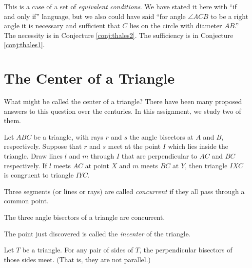 This is a case of a set of \emph{equivalent conditions}. We have stated it
here with ``if and only if'' language, but we also could have said ``for angle $\angle ACB$ to be a right angle it is necessary and sufficient that $C$ lies on the circle with diameter $AB$.'' The necessity is in Conjecture \ref{conj:thales2}. The sufficiency is in Conjecture \ref{conj:thales1}.



\chapter{The Center of a Triangle}

What might be called the center of a triangle? There have been many proposed answers to this question over the centuries. In this assignment, we study two of them.

\begin{conjecture}\label{conj:angle-bisectors-concurrent}
Let $ABC$ be a triangle, with rays $r$ and $s$ the angle bisectors at $A$ and $B$, respectively. Suppose that $r$ and $s$ meet at the point $I$ which lies inside the triangle. Draw lines $l$ and $m$ through $I$ that are perpendicular to $AC$ and $BC$ respectively. If $l$ meets $AC$ at point $X$ and $m$ meets $BC$ at $Y$, then triangle $IXC$ is congruent to triangle $IYC$.
\end{conjecture}


\begin{definition}\label{defn:concurrent}
Three segments (or lines or rays) are called \emph{concurrent} if they all pass through a common point.
\end{definition}

\begin{conjecture}\label{conj:incenter-concurrent}
The three angle bisectors of a triangle are concurrent.
\end{conjecture}

\begin{definition}\label{defn:incenter}
The point just discovered is called the \emph{incenter} of the triangle.
\end{definition}

\begin{conjecture}\label{conj:meeting-perp-bisectors}
Let $T$ be a triangle. For any pair of sides of $T$, the perpendicular bisectors of those sides meet. (That is, they are not parallel.)
\end{conjecture}

